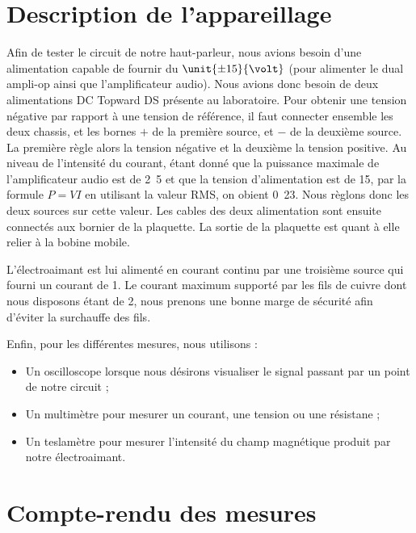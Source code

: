 

\section{Description de l'appareillage}
Afin de tester le circuit de notre haut-parleur, nous avions besoin d'une alimentation
capable de fournir du $\unit{\pm 15}{\volt}$ (pour alimenter le dual ampli-op ainsi
que l'amplificateur audio). Nous avions donc besoin de deux alimentations DC Topward 
 DS présente au laboratoire. Pour obtenir une tension négative par 
rapport à une tension de référence, il faut connecter ensemble les deux chassis,
et les bornes $+$ de la première source, et $-$ de la deuxième source. La première règle
alors la tension négative et la deuxième la tension positive\cite{dctopward}.
Au niveau de l'intensité du courant, étant donné que la puissance maximale de l'amplificateur
audio est de \unit{2.5}{\watt}\cite{datasheetampli} et que la tension d'alimentation est de \unit{15}{\volt}, par
la formule $P = VI$ en utilisant la valeur RMS, on obient \unit{0.23}{\ampere}. Nous règlons
donc les deux sources sur cette valeur. Les cables des deux alimentation sont ensuite connectés 
aux bornier de la plaquette. La sortie de la plaquette est quant à elle relier à la bobine mobile.

L'électroaimant est lui alimenté en courant continu par une troisième source qui 
fourni un courant de \unit{1}{\ampere}. Le courant maximum supporté par les fils de 
cuivre dont nous disposons étant de \unit{2}{\ampere}\cite{norme-cuivre}, nous prenons
une bonne marge de sécurité afin d'éviter la surchauffe des fils.

Enfin, pour les différentes mesures, nous utilisons :

\begin{itemize}
	\item Un oscilloscope lorsque nous désirons visualiser le signal passant par un point de notre circuit ;
	\item Un multimètre pour mesurer un courant, une tension ou une résistane ;
	\item Un teslamètre pour mesurer l'intensité du champ magnétique produit par notre électroaimant.
\end{itemize}

\section{Compte-rendu des mesures}

